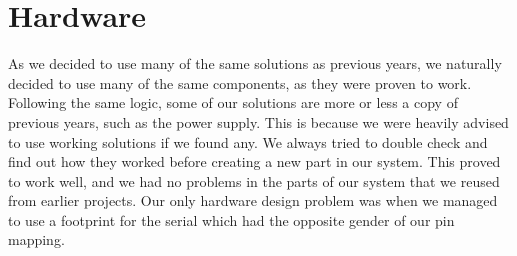 \section {Hardware}

As we decided to use many of the same solutions as previous years, we naturally
decided to use many of the same components, as they were proven to
work. Following the same logic, some of our solutions are more or less a copy of
previous years, such as the power supply. This is because we were heavily
advised to use working solutions if we found any. We always
tried to double check and find out how they worked before creating a new part in
our system. This proved to work well, and we had no problems in the parts of our
system that we reused from earlier projects. Our only hardware design problem was
when we managed to use a footprint for the serial which had the opposite gender
of our pin mapping.
